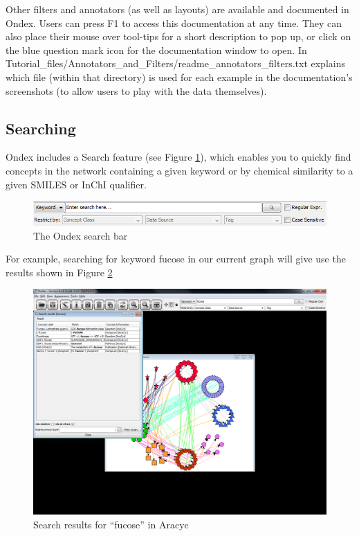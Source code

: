 Other filters and annotators (as well as layouts) are available and documented in Ondex.
Users can press F1 to access this documentation at any time.
They can also place their mouse over tool-tips for a short description to pop up,
or click on the blue question mark icon for the documentation window to open.
In Tutorial\_files/Annotators\_and\_Filters/readme\_annotators\_filters.txt explains which file (within that directory) 
is used for each example in the documentation's screenshots (to allow users to play with the data themselves).

\subsection{Searching}
\label{sec:search}
Ondex includes a Search feature (see Figure \ref{fig:vis_search_bar}), which enables you to quickly find concepts in the network containing a given keyword or by chemical similarity to a given SMILES or InChI qualifier.
\begin{figure}[H]
\centering
\includegraphics[scale=0.6]{images/Jun12/search_bar.png} 
\caption{The Ondex search bar}
\label{fig:vis_search_bar}
\end{figure}

For example, searching for keyword fucose in our current graph will give use the results shown in Figure \ref{fig:search_results}
\begin{figure}[H]
\centering
\includegraphics[scale=0.3]{images/Jun12/aracyc_search_fucose.png} 
\caption{Search results for ``fucose'' in Aracyc}
\label{fig:search_results}
\end{figure}

